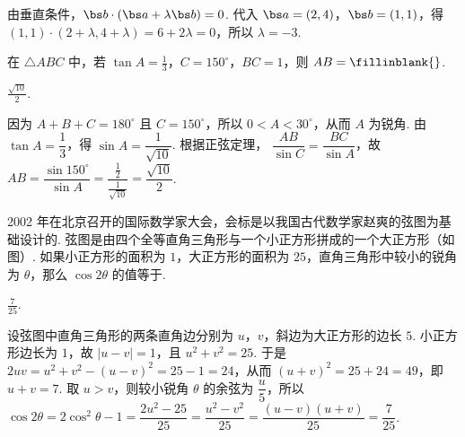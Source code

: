 \begin{solution}
由垂直条件，\(\bs b\cdot\left(\bs a+\lambda\bs b\right)=0\). 代入 \(\bs a=(2,4)\)，\(\bs b=(1,1)\)，得
\((1,1)\cdot(2+\lambda,4+\lambda)=6+2\lambda=0\)，所以 \(\lambda=-3\).
\end{solution}

\begin{problem}
在 \(\triangle ABC\) 中，若 \(\tan A = \frac{1}{3}\)，\(C = 150^{\circ}\)，\(BC = 1\)，则 \(AB =\fillinblank{}\).
\end{problem}

\begin{answer}
\(\frac{\sqrt{10}}{2}\).
\end{answer}

\begin{solution}
因为 \(A+B+C=180^{\circ}\) 且 \(C=150^{\circ}\)，所以 \(0<A<30^{\circ}\)，从而 \(A\) 为锐角. 由 \(\tan A=\dfrac13\)，得 \(\sin A=\dfrac{1}{\sqrt{10}}\). 根据正弦定理，
\(\dfrac{AB}{\sin C}=\dfrac{BC}{\sin A}\)，故
\(AB=\dfrac{\sin150^{\circ}}{\sin A}=\dfrac{\frac{1}{2}}{\frac{1}{\sqrt{10}}}=\dfrac{\sqrt{10}}2\).
\end{solution}

\begin{problem}
2002 年在北京召开的国际数学家大会，会标是以我国古代数学家赵爽的弦图为基础设计的. 弦图是由四个全等直角三角形与一个小正方形拼成的一个大正方形（如图）. 如果小正方形的面积为 \(1\)，大正方形的面积为 \(25\)，直角三角形中较小的锐角为 \(\theta\)，那么 \(\cos 2\theta\) 的值等于\fillinblank{}.

\end{problem}

\begin{answer}
\(\frac{7}{25}\).
\end{answer}

\begin{solution}
设弦图中直角三角形的两条直角边分别为 \(u\)，\(v\)，斜边为大正方形的边长 \(5\). 小正方形边长为 \(1\)，故 \(|u-v|=1\)，且 \(u^2+v^2=25\). 于是
\(2uv=u^2+v^2-(u-v)^2=25-1=24\)，从而 \((u+v)^2=25+24=49\)，即 \(u+v=7\). 取 \(u>v\)，则较小锐角 \(\theta\) 的余弦为 \(\dfrac{u}{5}\)，所以
\(\cos2\theta=2\cos^2\theta-1=\dfrac{2u^2-25}{25}=\dfrac{u^2-v^2}{25}=\dfrac{(u-v)(u+v)}{25}=\dfrac7{25}\).
\end{solution}


